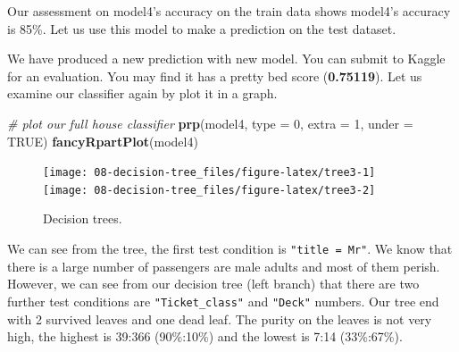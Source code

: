 \documentclass[
]{book}
\newenvironment{Shaded}{\begin{snugshade}}{\end{snugshade}}
\newcommand{\CommentTok}[1]{\textcolor[rgb]{0.56,0.35,0.01}{\textit{#1}}}
\newcommand{\DataTypeTok}[1]{\textcolor[rgb]{0.13,0.29,0.53}{#1}}
\newcommand{\DecValTok}[1]{\textcolor[rgb]{0.00,0.00,0.81}{#1}}
\newcommand{\KeywordTok}[1]{\textcolor[rgb]{0.13,0.29,0.53}{\textbf{#1}}}
\newcommand{\NormalTok}[1]{#1}
\newcommand{\OperatorTok}[1]{\textcolor[rgb]{0.81,0.36,0.00}{\textbf{#1}}}
\newcommand{\OtherTok}[1]{\textcolor[rgb]{0.56,0.35,0.01}{#1}}
\newcommand{\StringTok}[1]{\textcolor[rgb]{0.31,0.60,0.02}{#1}}
\begin{document}
Our assessment on model4's accuracy on the train data shows model4's accuracy is 85\%. Let us use this model to make a prediction on the test dataset.

\begin{Shaded}
\end{Shaded}

We have produced a new prediction with new model. You can submit to Kaggle for an evaluation. You may find it has a pretty bed score (\textbf{0.75119}). Let us examine our classifier again by plot it in a graph.

\begin{Shaded}
\begin{Highlighting}[]
\CommentTok{# plot our full house classifier }
\KeywordTok{prp}\NormalTok{(model4, }\DataTypeTok{type =} \DecValTok{0}\NormalTok{, }\DataTypeTok{extra =} \DecValTok{1}\NormalTok{, }\DataTypeTok{under =} \OtherTok{TRUE}\NormalTok{)}
\KeywordTok{fancyRpartPlot}\NormalTok{(model4)}
\end{Highlighting}
\end{Shaded}

\begin{figure}

{\centering \texttt{[image: 08-decision-tree\_files/figure-latex/tree3-1]} \texttt{[image: 08-decision-tree\_files/figure-latex/tree3-2]} 

}

\caption{Decision trees.}\label{fig:tree3}
\end{figure}

We can see from the tree, the first test condition is \texttt{"title\ =\ Mr"}. We know that there is a large number of passengers are male adults and most of them perish. However, we can see from our decision tree (left branch) that there are two further test conditions are \texttt{"Ticket\_class"} and \texttt{"Deck"} numbers. Our tree end with 2 survived leaves and one dead leaf. The purity on the leaves is not very high, the highest is 39:366 (90\%:10\%) and the lowest is 7:14 (33\%:67\%).
\end{document}
